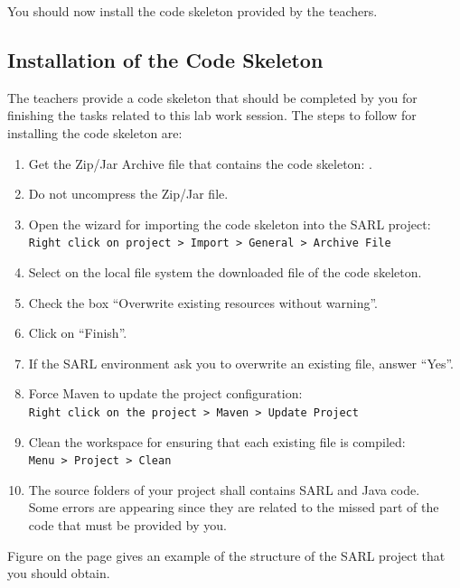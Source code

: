 \ifCODESKELETON
	You should now install the code skeleton provided by the teachers.

	\subsection{Installation of the Code Skeleton}

	The teachers provide a code skeleton that should be completed by you for finishing the tasks related to this lab work session.
	The steps to follow for installing the code skeleton are:
	\begin{enumerate}
	\item Get the Zip/Jar Archive file that contains the code skeleton: \skeletonName.
	\item Do not uncompress the Zip/Jar file.
	\item Open the wizard for importing the code skeleton into the SARL project: \\
		\texttt{Right click on project > Import > General > Archive File}
	\item Select on the local file system the downloaded file of the code skeleton.
	\item Check the box ``Overwrite existing resources without warning''.
	\item Click on ``Finish''.
	\item If the SARL environment ask you to overwrite an existing file, answer ``Yes''.
	\item Force Maven to update the project configuration: \\
		\texttt{Right click on the project > Maven > Update Project}
	\item Clean the workspace for ensuring that each existing file is compiled: \\
		\texttt{Menu > Project > Clean}
	\item The source folders of your project shall contains SARL and Java code. \\
		Some errors are appearing since they are related to the missed part of the code that must be provided by you. 
	\end{enumerate}

	Figure  on the page  gives an example of the structure of the SARL project that you should obtain.

\fi

